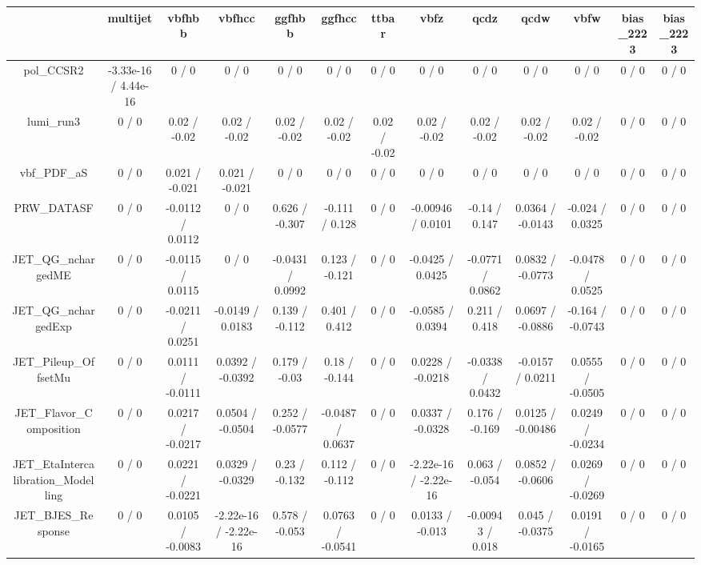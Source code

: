 \documentclass[10pt]{article}
\begin{document}
\begin{table}[htbp]
\begin{center}
\begin{tabular}{|c|c|c|c|c|c|c|c|c|c|c|c|c|}
\hline 
      & multijet      & vbfhbb      & vbfhcc      & ggfhbb      & ggfhcc      & ttbar      & vbfz      & qcdz      & qcdw      & vbfw      & bias_2223      & bias_2223 \\ 
\hline 
  pol_CCSR2 & -3.33e-16 / 4.44e-16 & 0 / 0 & 0 / 0 & 0 / 0 & 0 / 0 & 0 / 0 & 0 / 0 & 0 / 0 & 0 / 0 & 0 / 0 & 0 / 0 & 0 / 0 \\ 
  lumi_run3 & 0 / 0 & 0.02 / -0.02 & 0.02 / -0.02 & 0.02 / -0.02 & 0.02 / -0.02 & 0.02 / -0.02 & 0.02 / -0.02 & 0.02 / -0.02 & 0.02 / -0.02 & 0.02 / -0.02 & 0 / 0 & 0 / 0 \\ 
  vbf_PDF_aS & 0 / 0 & 0.021 / -0.021 & 0.021 / -0.021 & 0 / 0 & 0 / 0 & 0 / 0 & 0 / 0 & 0 / 0 & 0 / 0 & 0 / 0 & 0 / 0 & 0 / 0 \\ 
  PRW_DATASF & 0 / 0 & -0.0112 / 0.0112 & 0 / 0 & 0.626 / -0.307 & -0.111 / 0.128 & 0 / 0 & -0.00946 / 0.0101 & -0.14 / 0.147 & 0.0364 / -0.0143 & -0.024 / 0.0325 & 0 / 0 & 0 / 0 \\ 
  JET_QG_nchargedME & 0 / 0 & -0.0115 / 0.0115 & 0 / 0 & -0.0431 / 0.0992 & 0.123 / -0.121 & 0 / 0 & -0.0425 / 0.0425 & -0.0771 / 0.0862 & 0.0832 / -0.0773 & -0.0478 / 0.0525 & 0 / 0 & 0 / 0 \\ 
  JET_QG_nchargedExp & 0 / 0 & -0.0211 / 0.0251 & -0.0149 / 0.0183 & 0.139 / -0.112 & 0.401 / 0.412 & 0 / 0 & -0.0585 / 0.0394 & 0.211 / 0.418 & 0.0697 / -0.0886 & -0.164 / -0.0743 & 0 / 0 & 0 / 0 \\ 
  JET_Pileup_OffsetMu & 0 / 0 & 0.0111 / -0.0111 & 0.0392 / -0.0392 & 0.179 / -0.03 & 0.18 / -0.144 & 0 / 0 & 0.0228 / -0.0218 & -0.0338 / 0.0432 & -0.0157 / 0.0211 & 0.0555 / -0.0505 & 0 / 0 & 0 / 0 \\ 
  JET_Flavor_Composition & 0 / 0 & 0.0217 / -0.0217 & 0.0504 / -0.0504 & 0.252 / -0.0577 & -0.0487 / 0.0637 & 0 / 0 & 0.0337 / -0.0328 & 0.176 / -0.169 & 0.0125 / -0.00486 & 0.0249 / -0.0234 & 0 / 0 & 0 / 0 \\ 
  JET_EtaIntercalibration_Modelling & 0 / 0 & 0.0221 / -0.0221 & 0.0329 / -0.0329 & 0.23 / -0.132 & 0.112 / -0.112 & 0 / 0 & -2.22e-16 / -2.22e-16 & 0.063 / -0.054 & 0.0852 / -0.0606 & 0.0269 / -0.0269 & 0 / 0 & 0 / 0 \\ 
  JET_BJES_Response & 0 / 0 & 0.0105 / -0.0083 & -2.22e-16 / -2.22e-16 & 0.578 / -0.053 & 0.0763 / -0.0541 & 0 / 0 & 0.0133 / -0.013 & -0.00943 / 0.018 & 0.045 / -0.0375 & 0.0191 / -0.0165 & 0 / 0 & 0 / 0 \\ 

\end{tabular}
\end{center}
\end{table}
\end{document}
